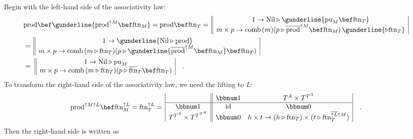 Begin with the left-hand side of the associativity law:
\begin{align*}
 & \text{prod}\bef\gunderline{\text{prod}^{\uparrow M}\bef\text{ftn}_{M}}=\text{prod}\bef\text{ftn}_{T}=\,\begin{array}{||c|}
1\rightarrow\text{Nil}\triangleright\gunderline{\text{pu}_{M}\bef\text{ftn}_{T}}\\
m\times p\rightarrow\text{comb}\,(m)(p\triangleright\overline{\text{prod}}^{\uparrow M}\bef\text{ftn}_{M})\,\gunderline{\triangleright\text{ftn}_{T}}
\end{array}\\
 & =\,\begin{array}{||c|}
1\rightarrow\gunderline{\text{Nil}\triangleright\text{prod}}\\
m\times p\rightarrow\text{comb}\,(m\triangleright\text{ftn}_{T})(p\triangleright\gunderline{\overline{\text{prod}}^{\uparrow M}\bef\text{ftn}_{M}}\bef\text{ftn}_{T})
\end{array}\\
 & =\,\,\begin{array}{||c|}
1\rightarrow\text{Nil}\triangleright\text{pu}_{M}\\
m\times p\rightarrow\text{comb}\,(m\triangleright\text{ftn}_{T})(p\triangleright\overline{\text{ftn}}_{T}\bef\text{ftn}_{T})
\end{array}\quad.
\end{align*}
To transform the right-hand side of the associativity law, we need
the lifting to $L$:
\[
\text{prod}^{\uparrow M\uparrow L}\bef\text{ftn}_{M}^{\uparrow L}=\text{ftn}_{T}^{\uparrow L}=\,\begin{array}{|c||cc|}
 & \bbnum 1 & T^{A}\times T^{T^{A}}\\
\hline \bbnum 1 & \text{id} & \bbnum 0\\
T^{T^{A}}\times T^{T^{T^{A}}} & \bbnum 0 & h\times t\rightarrow(h\triangleright\text{ftn}_{T})\times(t\triangleright\text{ftn}_{T}^{\overline{\uparrow L}\uparrow M})
\end{array}\quad.
\]
Then the right-hand side is written as
